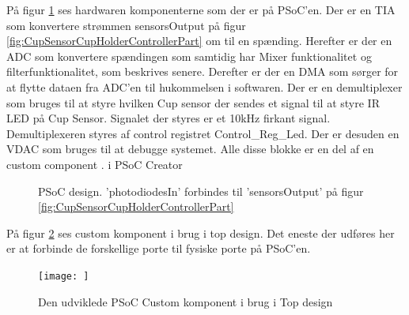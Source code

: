\documentclass[HardwareDesign/HardwareDesign_main.tex]{subfiles}
\begin{document}
På figur \ref{fig:CupSensorPSoCDesign} ses hardwaren komponenterne som der er på PSoC'en. Der er en TIA som konvertere strømmen sensorsOutput på figur \ref{fig:CupSensorCupHolderControllerPart} om til en spænding. Herefter er der en ADC som konvertere spændingen som samtidig har Mixer funktionalitet og filterfunktionalitet, som beskrives senere. Derefter er der en DMA som sørger for at flytte dataen fra ADC'en til hukommelsen i softwaren. Der er en demultiplexer som bruges til at styre hvilken Cup sensor der sendes et signal til at styre IR LED på Cup Sensor. Signalet der styres er et 10kHz firkant signal. Demultiplexeren styres af control registret Control\_Reg\_Led. Der er desuden en VDAC som bruges til at debugge systemet. Alle disse blokke er en del af en custom component \autocite{PSoCHowToCreateCustomComponents}.  i PSoC Creator 
\begin{figure}[H]
    \centering
    \caption{PSoC design. 'photodiodesIn' forbindes til 'sensorsOutput' på figur \ref{fig:CupSensorCupHolderControllerPart}}
    \label{fig:CupSensorPSoCDesign}
\end{figure}

På figur \ref{fig:CupSensorComponentInTopDesign} ses custom komponent i brug i top design. Det eneste der udføres her er at forbinde de forskellige porte til fysiske porte på PSoC'en.   
\begin{figure}[H]
    \centering
    \texttt{[image: ]}
    \caption{Den udviklede PSoC Custom komponent i brug i Top design}
    \label{fig:CupSensorComponentInTopDesign}
\end{figure}
\end{document}
